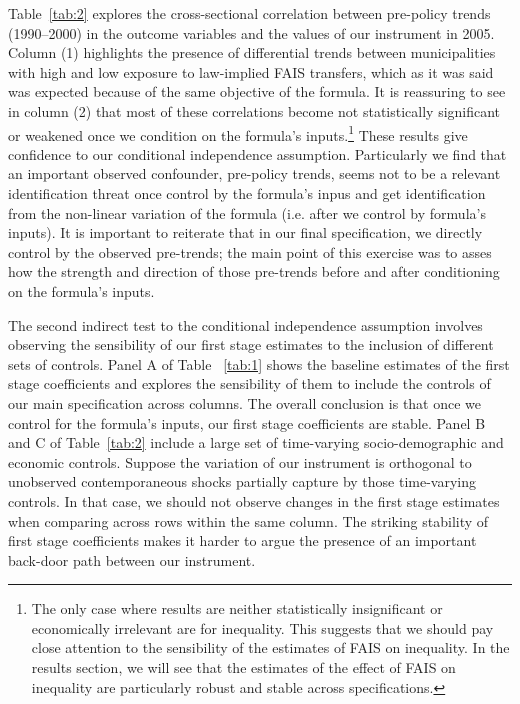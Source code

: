 \documentclass[dv_diss_main.tex]{subfiles}
\begin{document}
{Table}~\ref{tab:2} explores the cross-sectional correlation between pre-policy trends (1990–2000) in the outcome variables and the values of our instrument in 2005. Column (1) highlights the presence of differential trends between municipalities with high and low exposure to law-implied FAIS transfers, which as it was said was expected because of the same objective of the formula. It is reassuring to see in column (2) that most of these correlations become not statistically significant or weakened once we condition on the formula's inputs.\footnote{ The only case where results are neither statistically insignificant or economically irrelevant are for inequality. This suggests that we should pay close attention to the sensibility of the estimates of FAIS on inequality. In the results section, we will see that the estimates of the effect of FAIS on inequality are particularly robust and stable across specifications.} 
These results give confidence to our conditional independence assumption. Particularly we find that an important observed confounder, pre-policy trends, seems not to be a relevant identification threat once control by the formula's inpus and get identification from the non-linear variation of the formula (i.e. after we control by formula's inputs). It is important to reiterate that in our final specification, we directly control by the observed pre-trends; the main point of this exercise was to asses how the strength and direction of those pre-trends before and after conditioning on the formula's inputs. 

The second indirect test to the conditional independence assumption involves observing the sensibility of our first stage estimates to the inclusion of different sets of controls. Panel A of {Table} ~\ref{tab:1} shows the baseline estimates of the first stage coefficients and explores the sensibility of them to include the controls of our main specification across columns. The overall conclusion is that once we control for the formula's inputs, our first stage coefficients are stable. Panel B and C of {Table}~\ref{tab:2} include a large set of time-varying socio-demographic and economic controls. Suppose the variation of our instrument is orthogonal to unobserved contemporaneous shocks partially capture by those time-varying controls. In that case, we should not observe changes in the first stage estimates when comparing across rows within the same column. The striking stability of first stage coefficients makes it harder to argue the presence of an important back-door path between our instrument.
\end{document}
